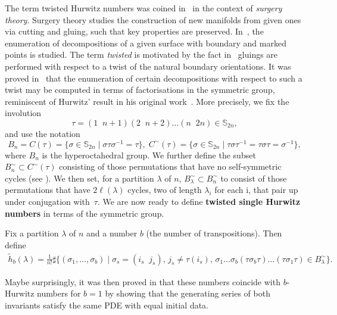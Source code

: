\documentclass[ALCO,published]{cedram}
\begin{document}
The term twisted Hurwitz numbers was coined in~\cite{BF21} in the context of \textit{surgery theory}. Surgery theory studies the construction of new manifolds from given ones via cutting and gluing, such that key properties are preserved. In~\cite{BF21}, the enumeration of decompositions of a given surface with boundary and marked points is studied. The term \textit{twisted} is motivated by the fact in~\cite{BF21} gluings are performed with respect to a twist of the natural boundary orientations. It was proved in~\cite{BF21} that the enumeration of certain decompositions with respect to such a twist may be computed in terms of factorisations in the symmetric group, reminiscent of Hurwitz' result in his original work~\cite{hurwitz1892algebraische}. More precisely, we fix the involution $$\tau= (1\;\; n+1) (2 \;\;n+2) \ldots (n \;\;2n)\in \mathbb{S}_{2n},$$ and use the notation
\begin{equation*}
    B_n=C(\tau)=\{\sigma \in \mathbb{S}_{2n} \mid  \sigma \tau \sigma^{-1}=\tau\}, \; C^\sim(\tau)=\{\sigma \in \mathbb{S}_{2n} \mid  \tau \sigma \tau^{-1} = \tau \sigma \tau =  \sigma^{-1}\},
\end{equation*}
where $B_n$ is the hyperoctahedral group. We further define the subset $B^\sim_n \subset C^\sim(\tau)$ consisting of those permutations that have no self-symmetric cycles (see \cite[Lemma~2.1]{BF21}). We then set, for a partition $\lambda$ of $n$,  $B^\sim_\lambda\subset B^\sim_n$ to consist of those permutations that have $2\ell(\lambda)$ cycles, two of length $\lambda_i$ for each i, that pair up under conjugation with~$\tau$. We are now ready to define \textbf{twisted single Hurwitz numbers} in terms of the symmetric group.

\begin{defi}
\label{def:twisthur}
Fix a partition $\lambda$ of $n$ and a number $b$ (the number of transpositions).
Then define
\begin{align*}
\tilde{h}_{b}(\lambda)= \frac{1}{n!}\sharp \Big\{(\sigma_1,\ldots,\sigma_b) \mid  \sigma_s=(i_s\;\;j_s),\, j_s\neq \tau(i_s),\, \sigma_1\ldots\sigma_b (\tau\sigma_b\tau)\ldots (\tau\sigma_1\tau) \in B^{\sim}_\lambda\Big\}.
\end{align*}
\end{defi}

Maybe surprisingly, it was then proved in \cite[Theorem 3.2]{BF21} that these numbers coincide with $b$-Hurwitz numbers for $b=1$ by showing that the generating series of both invariants satisfy the same PDE with equal initial data.
\end{document}
